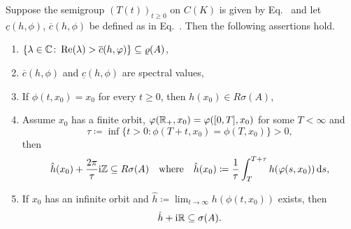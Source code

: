 \begin{proposition}\label{prop:b3-4.8}
Suppose the semigroup $(T(t))_{t\geq 0}$ on $C(K)$ is given by 
Eq.~ and let $\underline{c}(h,\phi)$, $\overline{c}(h,\phi)$ be defined as in Eq.~.
Then the following assertions hold.
\begin{enumerate}[\upshape (i)]
\item 
	$\{\lambda \in \C \colon \Re(\lambda) > \overline{c}(h,\phi)\} \subseteq \rho(A)$, 
		
\item 
	$\overline{c}(h,\phi)$ and $\underline{c}(h,\phi)$ are spectral values, 
		
\item 
	If\/ $\phi(t,x_{0}) = x_{0}$ for every $t \geq 0$, then $h(x_{0}) \in R{\sigma}(A)$, 
		
\item 
Assume $x_{0}$ has a finite orbit, \ie $\phi(\R_{+},x_{0}) = \phi([0,T],x_{0})$ for some $T < \infty$ and 
\[
\tau \coloneq \inf\{t > 0 \colon \phi(T+t,x_{0}) = \phi(T,x_{0})\} > 0, 
\]
then 
\[
\hat{h}(x_{0}) + \frac{2\pi}{\tau}\im\Z \subseteq R{\sigma}(A)\quad\text{where}\quad \hat{h}(x_{0}) \coloneq \frac{1}{\tau}\int_{T}^{T+\tau}h(\phi(s,x_{0}))\ds,
\]
		
\item 
	If\/ $x_{0}$ has an infinite orbit and 
	$\hat{h} \coloneq  \lim_{t\to\infty}h(\phi(t,x_{0}))$ exists, then 
    \[
    \hat{h} + \mathrm{i}\mathbb{R} \subseteq \sigma(A) .
    \]
\end{enumerate}
\end{proposition}
